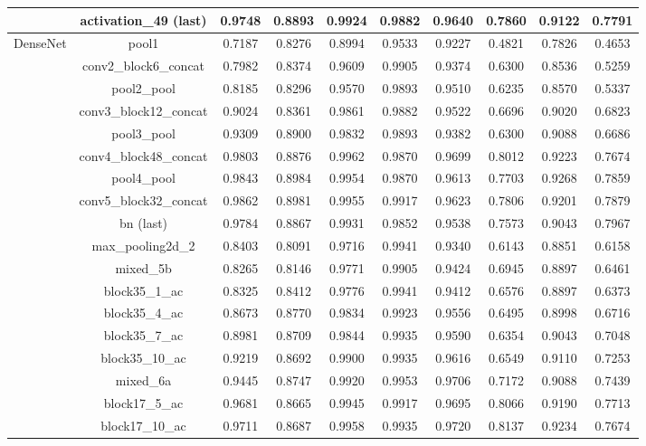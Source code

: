 \begin{table}
\begin{tabular}{|c|c|ccccc|ccc|}
    & activation\_49 (last) & 0.9748 & 0.8893 & 0.9924 & 0.9882 & 0.9640 & 0.7860 & 0.9122 & 0.7791 \\
    \hline
    \multirow{11}{*}{DenseNet} & pool1 & 0.7187 & 0.8276 & 0.8994 & 0.9533 & 0.9227 & 0.4821 & 0.7826 & 0.4653 \\
    & conv2\_block6\_concat & 0.7982 & 0.8374 & 0.9609 & 0.9905 & 0.9374 & 0.6300 & 0.8536 & 0.5259 \\
    & pool2\_pool & 0.8185 & 0.8296 & 0.9570 & 0.9893 & 0.9510 & 0.6235 & 0.8570 & 0.5337 \\
    & conv3\_block12\_concat & 0.9024 & 0.8361 & 0.9861 & 0.9882 & 0.9522 & 0.6696 & 0.9020 & 0.6823 \\
    & pool3\_pool & 0.9309 & 0.8900 & 0.9832 & 0.9893 & 0.9382 & 0.6300 & 0.9088 & 0.6686 \\
    & conv4\_block48\_concat & 0.9803 & 0.8876 & 0.9962 & 0.9870 & 0.9699 & 0.8012 & 0.9223 & 0.7674 \\
    & pool4\_pool & 0.9843 & 0.8984 & 0.9954 & 0.9870 & 0.9613 & 0.7703 & 0.9268 & 0.7859 \\
    & conv5\_block32\_concat & 0.9862 & 0.8981 & 0.9955 & 0.9917 & 0.9623 & 0.7806 & 0.9201 & 0.7879 \\
    & bn (last) & 0.9784 & 0.8867 & 0.9931 & 0.9852 & 0.9538 & 0.7573 & 0.9043 & 0.7967 \\
    \hline
    \multirow{18}{*}{IncResV2} & max\_pooling2d\_2 & 0.8403 & 0.8091 & 0.9716 & 0.9941 & 0.9340 & 0.6143 & 0.8851 & 0.6158 \\
    & mixed\_5b & 0.8265 & 0.8146 & 0.9771 & 0.9905 & 0.9424 & 0.6945 & 0.8897 & 0.6461 \\
    & block35\_1\_ac & 0.8325 & 0.8412 & 0.9776 & 0.9941 & 0.9412 & 0.6576 & 0.8897 & 0.6373 \\
    & block35\_4\_ac & 0.8673 & 0.8770 & 0.9834 & 0.9923 & 0.9556 & 0.6495 & 0.8998 & 0.6716 \\
    & block35\_7\_ac & 0.8981 & 0.8709 & 0.9844 & 0.9935 & 0.9590 & 0.6354 & 0.9043 & 0.7048 \\
    & block35\_10\_ac & 0.9219 & 0.8692 & 0.9900 & 0.9935 & 0.9616 & 0.6549 & 0.9110 & 0.7253 \\
    & mixed\_6a & 0.9445 & 0.8747 & 0.9920 & 0.9953 & 0.9706 & 0.7172 & 0.9088 & 0.7439 \\
    & block17\_5\_ac & 0.9681 & 0.8665 & 0.9945 & 0.9917 & 0.9695 & 0.8066 & 0.9190 & 0.7713 \\
    & block17\_10\_ac & 0.9711 & 0.8687 & 0.9958 & 0.9935 & 0.9720 & 0.8137 & 0.9234 & 0.7674 \\

\end{tabular}
\end{table}
